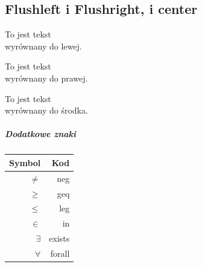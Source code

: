 \documentclass[a4paper]{article}
\begin{document}
\subsection{Flushleft i Flushright, i center}
\begin{flushleft}
To jest tekst\\
wyrównany do lewej.\\
\end{flushleft}
\begin{flushright}
To jest tekst\\
wyrównany do prawej.\\
\end{flushright}
\begin{center}
To jest tekst\\
wyrównany do środka.\\
\end{center}
\subparagraph{Dodatkowe znaki}
\begin{tabular}{| r | r |}
\hline
Symbol & Kod \\
\hline
$ \neq $ & neg \\
\hline
$ \geq $ & geq \\
\hline
$ \leq $ & leg \\
\hline
$ \in $ & in \\
\hline
$ \exists $ & exists \\
\hline
$ \forall $ & forall \\
\hline
\end{tabular}
\end{document}
